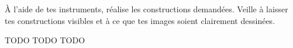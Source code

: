 %
%
À l'aide de tes instruments, réalise les constructions demandées.
    Veille à laisser tes constructions visibles et à ce que tes images
    soient clairement dessinées.
    \begin{tasks}
        \task 
        \task TODO
        \task TODO
        \task TODO
    \end{tasks}
